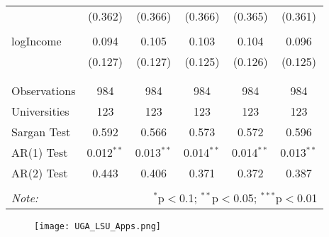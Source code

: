 \documentclass[12pt,english]{article}
\begin{document}
\begin{table}[!htbp]
\begin{tabular}{@{\extracolsep{5pt}}lccccc}
  & (0.362) & (0.366) & (0.366) & (0.365) & (0.361) \\ 
  & & & & & \\ 
 logIncome & 0.094 & 0.105 & 0.103 & 0.104 & 0.096 \\ 
  & (0.127) & (0.127) & (0.125) & (0.126) & (0.125) \\ 
  & & & & & \\ 
\hline \\[-1.8ex] 
Observations & 984 & 984 & 984 & 984 & 984 \\ 
Universities & 123 & 123 & 123 & 123 & 123 \\
Sargan Test & 0.592 & 0.566 & 0.573 & 0.572 & 0.596 \\
AR(1) Test & 0.012$^{**}$ & 0.013$^{**}$ & 0.014$^{**}$ & 0.014$^{**}$ & 0.013$^{**}$ \\
AR(2) Test & 0.443 & 0.406 & 0.371 & 0.372 & 0.387 \\ 
\hline 
\hline \\[-1.8ex] 
\textit{Note:}  & \multicolumn{5}{r}{$^{*}$p$<$0.1; $^{**}$p$<$0.05; $^{***}$p$<$0.01} \\ 
\end{tabular} 
\end{table} 

\begin{figure}
    \centering
    \texttt{[image: UGA\_LSU\_Apps.png]}
    \label{fig:NatGrow}
\end{figure}
\end{document}
